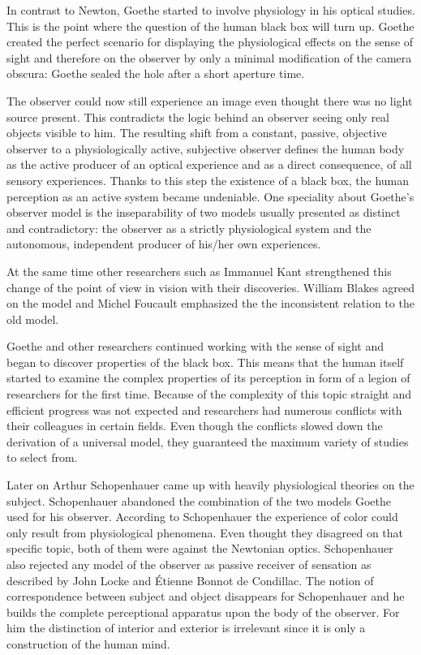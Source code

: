 \documentclass[12pt,a4paper]{article}
\begin{document}
In contrast to Newton, Goethe started to involve physiology in his optical studies. This is the point where
the question of the human black box will turn up. Goethe created the perfect scenario for displaying the
physiological effects on the sense of sight and therefore on the observer by only a minimal modification of the
camera obscura: Goethe sealed the hole after a short aperture time.

The observer could now still experience an image even thought there was no
light source present. This contradicts the logic behind an observer seeing only real objects visible to him.
The resulting shift from a constant, passive, objective observer to a physiologically active, subjective
observer defines the human body as the active producer of an optical experience and as a direct
consequence, of all sensory experiences.
Thanks to this step the existence of a black box, the human perception as an active system became
undeniable. One speciality about Goethe's observer model is the inseparability of two models usually
presented as distinct and contradictory: the observer as a strictly physiological system and the
autonomous, independent producer of his/her own experiences.

At the same time other researchers such as Immanuel Kant strengthened this change of the point of view
in vision with their discoveries. William Blakes agreed on the model and Michel Foucault
emphasized the the inconsistent relation to the old model.

Goethe and other researchers continued working with the sense of sight and began to discover
properties of the black box.
This means that the human itself started to examine the complex properties of its perception
in form of a legion of researchers for the first time. Because of the complexity of this topic
straight and efficient progress was not expected and researchers had numerous conflicts with
their colleagues in certain fields. Even though the conflicts slowed down the derivation of a
universal model, they guaranteed the maximum variety of studies to select from.

Later on Arthur Schopenhauer came up with heavily physiological theories on the subject. Schopenhauer
abandoned the combination of the two models Goethe used for his observer. According to Schopenhauer
the experience of color could only result from physiological phenomena. Even thought they disagreed on
that specific topic, both of them were against the Newtonian optics. Schopenhauer also rejected any model
of the observer as passive receiver of sensation as described by John Locke and Étienne Bonnot de Condillac.
The notion of correspondence between subject and object disappears for Schopenhauer and he
builds the complete perceptional apparatus upon the body of the observer. For him the distinction of
interior and exterior is irrelevant since it is only a construction of the human mind.
\end{document}
